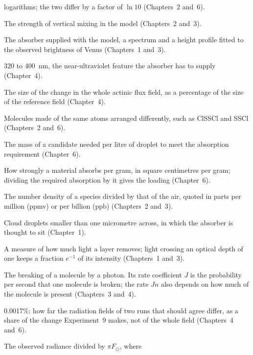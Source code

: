 {\begin{description}[leftmargin=0pt, itemsep=3pt]
    logarithms; the two differ by a factor of $\ln 10$ (Chapters~2 and~6).
  \item[Eddy diffusion coefficient, $K_{zz}$.] The strength of vertical mixing in the
    model (Chapters~2 and~3).
  \item[Empirical absorber.] The absorber supplied with the model, a spectrum and a
    height profile fitted to the observed brightness of Venus (Chapters~1 and~3).
  \item[Enhancement band.] 320 to 400~nm, the near-ultraviolet feature the absorber has
    to supply (Chapter~4).
  \item[Field change, $\Delta F$.] The size of the change in the whole actinic flux
    field, as a percentage of the size of the reference field (Chapter~4).
  \item[Isomers.] Molecules made of the same atoms arranged differently, such as ClSSCl
    and SSCl (Chapters~2 and~6).
  \item[Loading.] The mass of a candidate needed per litre of droplet to meet the
    absorption requirement (Chapter~6).
  \item[Mass absorption coefficient, $\varepsilon$.] How strongly a material absorbs per
    gram, in square centimetres per gram; dividing the required absorption by it gives
    the loading (Chapter~6).
  \item[Mixing ratio.] The number density of a species divided by that of the air,
    quoted in parts per million (ppmv) or per billion (ppb) (Chapters~2 and~3).
  \item[Mode~1 droplets.] Cloud droplets smaller than one micrometre across, in which the
    absorber is thought to sit (Chapter~1).
  \item[Optical depth.] A measure of how much light a layer removes; light crossing an
    optical depth of one keeps a fraction $e^{-1}$ of its intensity (Chapters~1 and~3).
  \item[Photolysis.] The breaking of a molecule by a photon. Its rate coefficient $J$ is
    the probability per second that one molecule is broken; the rate $J n$ also depends
    on how much of the molecule is present (Chapters~3 and~4).
  \item[Radiation floor.] 0.0017\%: how far the radiation fields of two runs that should
    agree differ, as a share of the change Experiment~9 makes, not of the whole field
    (Chapters~4 and~6).
  \item[Reflectivity, $I/F$.] The observed radiance divided by $\pi F_\odot$, where

\end{description}}
